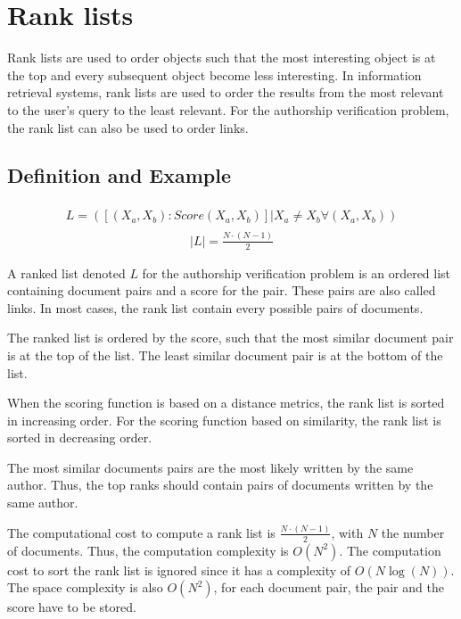 \section{Rank lists}

Rank lists are used to order objects such that the most interesting object is at the top and every subsequent object become less interesting.
In information retrieval systems, rank lists are used to order the results from the most relevant to the user's query to the least relevant.
For the authorship verification problem, the rank list can also be used to order links.

\subsection{Definition and Example}

\begin{definition}
  \begin{gather*}
      \begin{split}
        L = (\left[(X_a, X_b): Score(X_a, X_b)\right] | X_a \neq X_b \forall (X_a, X_b))
      \end{split}
  \end{gather*}
  \begin{gather*}
    |L| = \frac{N \cdot (N - 1)}{2}
  \end{gather*}
\end{definition}

A ranked list denoted $L$ for the authorship verification problem is an ordered list containing document pairs and a score for the pair.
These pairs are also called links.
In most cases, the rank list contain every possible pairs of documents.

The ranked list is ordered by the score, such that the most similar document pair is at the top of the list.
The least similar document pair is at the bottom of the list.

When the scoring function is based on a distance metrics, the rank list is sorted in increasing order.
For the scoring function based on similarity, the rank list is sorted in decreasing order.

The most similar documents pairs are the most likely written by the same author.
Thus, the top ranks should contain pairs of documents written by the same author.

The computational cost to compute a rank list is $\frac{N \cdot (N - 1)}{2}$, with $N$ the number of documents.
Thus, the computation complexity is $O(N^2)$.
The computation cost to sort the rank list is ignored since it has a complexity of $O(N\log(N))$.
The space complexity is also $O(N^2)$, for each document pair, the pair and the score have to be stored.

